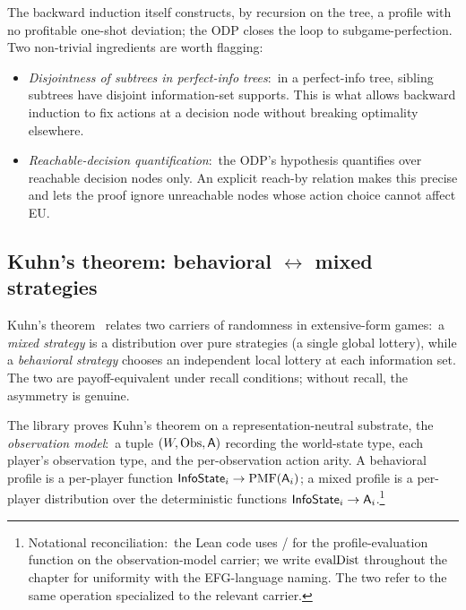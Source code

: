 \noindent The backward induction itself constructs, by recursion
on the tree, a profile with no profitable one-shot deviation; the
ODP closes the loop to subgame-perfection.  Two non-trivial
ingredients are worth flagging:
\begin{itemize}\itemsep2pt
\item \emph{Disjointness of subtrees in perfect-info trees}:\ in
a perfect-info tree, sibling subtrees have disjoint information-set
supports.  This is what allows backward induction to fix actions
at a decision node without breaking optimality elsewhere.

\item \emph{Reachable-decision quantification}:\ the ODP's
hypothesis quantifies over reachable decision nodes only.  An
explicit reach-by relation makes this precise and lets the proof
ignore unreachable nodes whose action choice cannot affect EU.
\end{itemize}



\subsection{Kuhn's theorem: \texorpdfstring{behavioral $\leftrightarrow$ mixed strategies}{behavioral vs.\ mixed strategies}}
\label{sec:theorems:kuhn}

Kuhn's theorem~\citep{Kuhn1953} relates two carriers of randomness
in extensive-form games:\ a \emph{mixed strategy} is a
distribution over pure strategies (a single global lottery),
while a \emph{behavioral strategy} chooses an independent local
lottery at each information set.  The two are payoff-equivalent
under recall conditions; without recall, the asymmetry is
genuine.

The library proves Kuhn's theorem on a representation-neutral
substrate, the \emph{observation model}:\ a tuple
$(W, \mathrm{Obs}, \mathsf{A})$ recording the world-state type, each
player's observation type, and the per-observation action arity.
A behavioral profile is a per-player function
$\mathsf{InfoState}_i \to \mathrm{PMF}(\mathsf{A}_i)$; a mixed profile is a per-player
distribution over the deterministic functions
$\mathsf{InfoState}_i \to \mathsf{A}_i$.\footnote{Notational reconciliation:\
the Lean code uses / for the
profile-evaluation function on the observation-model carrier; we
write $\mathrm{evalDist}$ throughout the chapter for uniformity with the
EFG-language naming.  The two refer to the same operation
specialized to the relevant carrier.}

